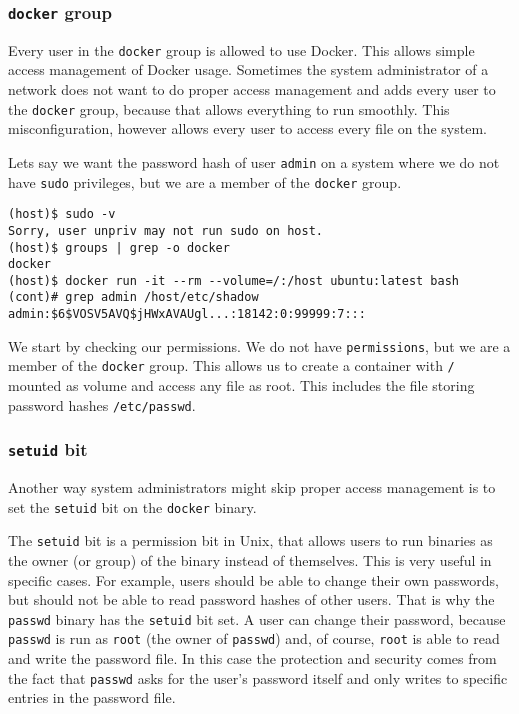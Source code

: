\subsubsection{\texorpdfstring{\lstinline{docker}}{docker} group}
Every user in the \lstinline{docker} group is allowed to use Docker. This allows simple access management of Docker usage. Sometimes the system administrator of a network does not want to do proper access management and adds every user to the \lstinline{docker} group, because that allows everything to run smoothly. This misconfiguration, however allows every user to access every file on the system.

\hfill

Lets say we want the password hash of user \lstinline{admin} on a system where we do not have \lstinline{sudo} privileges, but we are a member of the \lstinline{docker} group.

\begin{lstlisting}[caption={Docker \lstinline{group} exploit example},captionpos=b]
(host)$ sudo -v
Sorry, user unpriv may not run sudo on host.
(host)$ groups | grep -o docker
docker
(host)$ docker run -it --rm --volume=/:/host ubuntu:latest bash
(cont)# grep admin /host/etc/shadow
admin:$6$VOSV5AVQ$jHWxAVAUgl...:18142:0:99999:7:::
\end{lstlisting}

We start by checking our permissions. We do not have \lstinline{permissions}, but we are a member of the \lstinline{docker} group. This allows us to create a container with \lstinline{/} mounted as volume and access any file as root. This includes the file storing password hashes \lstinline{/etc/passwd}.

\subsubsection{\texorpdfstring{\lstinline{setuid}}{setuid} bit}
Another way system administrators might skip proper access management is to set the \lstinline{setuid} bit on the \lstinline{docker} binary.

\hfill

The \lstinline{setuid} bit is a permission bit in Unix, that allows users to run binaries as the owner (or group) of the binary instead of themselves.
This is very useful in specific cases. For example, users should be able to change their own passwords, but should not be able to read password hashes of other users. That is why the \lstinline{passwd} binary has the \lstinline{setuid} bit set. A user can change their password, because \lstinline{passwd} is run as \lstinline{root} (the owner of \lstinline{passwd}) and, of course, \lstinline{root} is able to read and write the password file. In this case the protection and security comes from the fact that \lstinline{passwd} asks for the user's password itself and only writes to specific entries in the password file.

